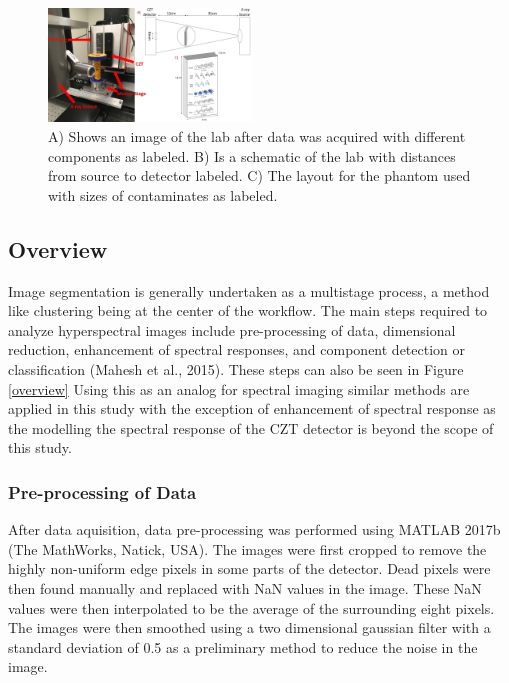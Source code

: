 \documentclass[a4paper,11pt]{article}
\begin{document}
\begin{figure}
  \vspace{-20pt}
  \begin{center}
    \includegraphics[width=0.48\textwidth]{FullFigure.jpg}
  \end{center}
  \vspace{-20pt}
  \caption{A) Shows an image of the lab after data was acquired with different components as labeled. B) Is a schematic of the lab with distances from source to detector labeled. C) The layout for the phantom used with sizes of contaminates as labeled.}
  \vspace{-10pt}
\end{figure}

\subsection{Overview}

Image segmentation is generally undertaken as a multistage process, a method like clustering being at the center of the workflow. The main steps required to analyze hyperspectral images include pre-processing of data, dimensional reduction, enhancement of spectral responses, and component detection or classification (Mahesh et al., 2015). These steps can also be seen in Figure \ref{overview} Using this as an analog for spectral imaging similar methods are applied in this study with the exception of enhancement of spectral response as the modelling the spectral response of the CZT detector is beyond the scope of this study.

\subsubsection{Pre-processing of Data}

After data aquisition, data pre-processing was performed using MATLAB 2017b (The MathWorks, Natick, USA). The images were first cropped to remove the highly non-uniform edge pixels in some parts of the detector. Dead pixels were then found manually and replaced with NaN values in the image. These NaN values were then interpolated to be the average of the surrounding eight pixels. The images were then smoothed using a two dimensional gaussian filter with a standard deviation of 0.5 as a preliminary method to reduce the noise in the image.
\end{document}
